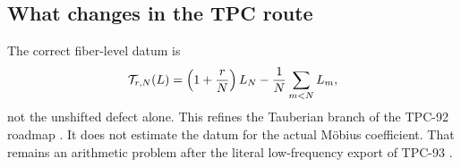 \subsection{What changes in the TPC route}

The correct fiber-level datum is
\[
 \mathcal T_{r,N}(L)
 =
 \left(1+\frac rN\right)L_N
 -\frac1N\sum_{m<N}L_m,
\]
not the unshifted defect alone.  This refines the Tauberian branch of
the TPC-92 roadmap \citep{WangTPC92}.  It does not estimate the datum
for the actual M\"obius coefficient.  That remains an arithmetic
problem after the literal low-frequency export of TPC-93
\citep{WangTPC93}.
